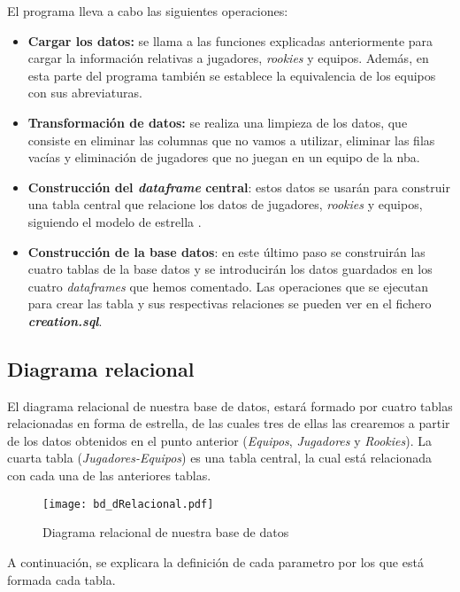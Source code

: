 \documentclass[11pt]{diazessay} %
\begin{document}
El programa lleva a cabo las siguientes operaciones:
\begin{itemize}
	\item \textbf{Cargar los datos:} se llama a las funciones explicadas anteriormente para cargar la información relativas a jugadores, \textit{rookies} y equipos.  Además, en esta parte del programa también se establece la equivalencia de los equipos con sus abreviaturas.
	\item \textbf{Transformación de datos:} se realiza una limpieza de los datos, que consiste en eliminar las columnas que no vamos a utilizar, eliminar las filas vacías y eliminación de jugadores que no juegan en un equipo de la nba.
	\item \textbf{Construcción del \textit{dataframe} central}: estos datos se usarán para construir una tabla central que relacione los datos de jugadores, \textit{rookies} y equipos, siguiendo el modelo de estrella \cite{estrella}.
	\item \textbf{Construcción de la base datos}: en este último paso se construirán las cuatro tablas de la base datos y se introducirán los datos guardados en los cuatro \textit{dataframes} que hemos comentado. Las operaciones que se ejecutan para crear las tabla y sus respectivas relaciones se pueden ver en el fichero \textit{\textbf{creation.sql}}.
\end{itemize}

\subsection*{Diagrama relacional}
El diagrama relacional de nuestra base de datos, estará formado por cuatro tablas relacionadas en forma de estrella, de las cuales tres de ellas las crearemos a partir de los datos obtenidos en el punto anterior (\textit{Equipos}, \textit{Jugadores} y \textit{Rookies}). La cuarta tabla (\textit{Jugadores-Equipos}) es una tabla central, la cual está relacionada con cada una de las anteriores tablas.

\begin{figure}[h!]
	\centering
	\texttt{[image: bd\_dRelacional.pdf]}
	\caption{Diagrama relacional de nuestra base de datos}
	\label{fig:diagrama}
\end{figure}

A continuación, se explicara la definición de cada parametro por los que está formada cada tabla.\\
\end{document}
